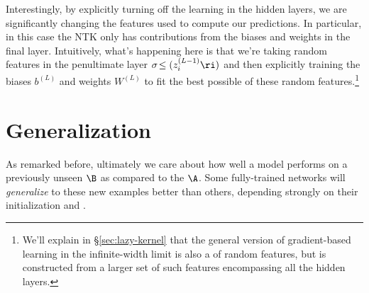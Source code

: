 Interestingly, by explicitly turning off the learning in the hidden layers, 
we are significantly changing the features used to compute our predictions.
In particular, in this case the NTK only has contributions from the biases and weights in the final layer.
Intuitively, what's happening here is that we're taking random features in the penultimate layer $\sigma\!\le(z^{(L-1)}_i\ri)$ and then explicitly training the biases $b^{(L)}$ and weights $W^{(L)}$ to fit the best possible  of these random features.\footnote{We'll explain in \S\ref{sec:lazy-kernel} that the general version of gradient-based learning in the infinite-width limit is also a  of random features, but is constructed from a larger set of such features encompassing all the hidden layers.}


























\section{Generalization}\label{sec:generalization-at-infinity}
As remarked before, ultimately we care about how well a model performs on a previously unseen  $\B$ as compared to the  $\A$. Some fully-trained networks will \emph{generalize} to these new examples better than others, depending strongly on their initialization and . 

